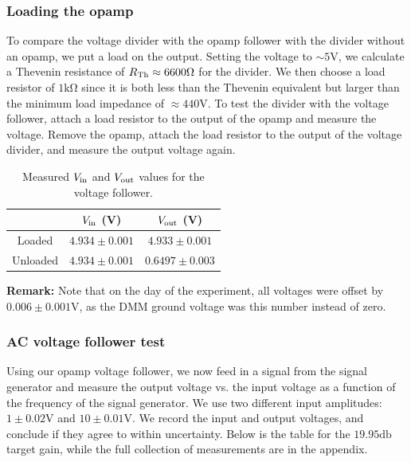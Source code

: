 \documentclass[11pt]{article}
\begin{document}
\subsubsection{Loading the opamp}
To compare the voltage divider with the opamp follower with the divider without
an opamp, we put a load on the output. Setting the voltage to 
$\sim 5 \si{\volt}$, we calculate a Thevenin resistance of 
$R_{\rm Th} \approx 6600\si{\ohm}$ for the divider. We then choose a load 
resistor of $1 \si{\kilo\ohm}$ since it is both less than the Thevenin 
equivalent but larger than the minimum load impedance of 
$\approx 440 \si{\volt}$.
To test the divider with the voltage follower, attach a load resistor to the 
output of the opamp and measure the voltage. 
Remove the opamp, attach the load resistor to the output of the voltage 
divider, and measure the output voltage again.
\begin{table}[H]
	\centering
	\begin{tabular}{|c|c|c|}
		\hline
		 & $V_{\rm in}$ (V) & $V_{\rm out}$ (V)\\
		\hline
		Loaded & $4.934 \pm 0.001$ & $4.933 \pm 0.001$\\
		Unloaded & $4.934 \pm 0.001$ & $0.6497 \pm 0.003$\\
		\hline
	\end{tabular}
	\caption{Measured $V_{\rm in}$ and $V_{\rm out}$ values
	for the voltage follower.}
\end{table}


\noin
\textbf{Remark:} Note that on the day of the experiment, all voltages were offset
by $0.006 \pm 0.001 \si{\volt}$, as the DMM ground voltage was this
number instead of zero.
\label{voltage_offset}

\subsubsection{AC voltage follower test}

Using our opamp voltage follower, we now feed in a
signal from the signal generator and measure the output
voltage vs. the input voltage as a function of the frequency
of the signal generator. We use two different input amplitudes:
$1 \pm 0.02 \si{\volt}$ and $10 \pm 0.01 \si{\volt}$.
We record the input and output voltages, and conclude
if they agree to within uncertainty. Below is the table for the 
$19.95 \si{\decibel}$ target 
gain, while the full collection of measurements are in the appendix. 
\end{document}
